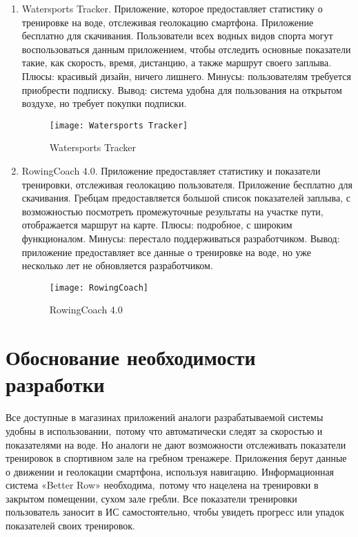 \documentclass[14pt]{extreport}
\begin{document}
\begin{enumerate}
\item Watersports Tracker. Приложение, которое предоставляет статистику о тренировке на воде, отслеживая геолокацию смартфона. Приложение бесплатно для скачивания. Пользователи всех водных видов спорта могут воспользоваться данным приложением, чтобы отследить основные показатели такие, как скорость, время, дистанцию, а также маршрут своего заплыва. Плюсы: красивый дизайн, ничего лишнего. Минусы: пользователям требуется приобрести подписку. Вывод: система удобна для пользования на открытом воздухе, но требует покупки подписки.
\begin{figure}[H]
\centerline{\texttt{[image: Watersports Tracker]}}
\caption{Watersports Tracker}
\label{fig14}
\end{figure}
\item RowingCoach 4.0. Приложение предоставляет статистику и показатели тренировки, отслеживая геолокацию пользователя. Приложение бесплатно для скачивания. Гребцам предоставляется большой список показателей заплыва, с возможностью посмотреть промежуточные результаты на участке пути, отображается маршрут на карте. Плюсы: подробное, с широким функционалом. Минусы: перестало поддерживаться разработчиком. Вывод: приложение предоставляет все данные о тренировке на воде, но уже несколько лет не обновляется разработчиком.
\begin{figure}[H]
\centerline{\texttt{[image: RowingCoach]}}
\caption{RowingCoach 4.0}
\label{fig14}
\end{figure}
\end{enumerate}

\section{Обоснование необходимости разработки}

Все доступные в магазинах приложений аналоги разрабатываемой системы удобны в использовании, потому что автоматически следят за скоростью и показателями на воде. Но аналоги не дают возможности отслеживать показатели тренировок в спортивном зале на гребном тренажере. Приложения берут данные о движении и геолокации смартфона, используя навигацию. Информационная система «Better Row» необходима, потому что нацелена на тренировки в закрытом помещении, сухом зале гребли. Все показатели тренировки пользователь заносит в ИС самостоятельно, чтобы увидеть прогресс или упадок показателей своих тренировок.
\end{document}
